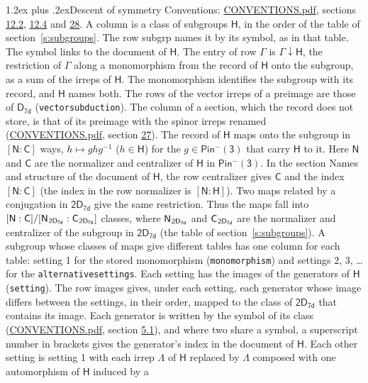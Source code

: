 \documentclass[10pt,a4paper]{article}
\makeatletter
\renewcommand\section{\@startsection{section}{1}{\z@}{-3ex plus -1ex minus -.2ex}%
  {1.2ex plus .2ex}{\normalfont\large\sffamily\bfseries\color{parttitle}}}
\numberwithin{equation}{section}
\newcommand{\grp}[1]{\mathsf{#1}}
\newcommand{\grpindex}[2]{[#1 : #2]}
\newcommand{\restr}[2]{#1\!\downarrow#2}
\newcommand{\hairsp}{\mkern1mu}
\makeatother
\begin{document}
\section{Descent of symmetry}\label{s:subduction}
Conventions: \href{../../CONVENTIONS.pdf}{CONVENTIONS.pdf}, sections \href{../../../rotation/CONVENTIONS.pdf\#conv.12.2}{12.2}, \href{../../../rotation/CONVENTIONS.pdf\#conv.12.4}{12.4} and \href{../../CONVENTIONS.pdf\#conv.28}{28}.
A column is a class of subgroups $\grp{H}$, in the order of the table of section~\ref{s:subgroups}. The row subgrp names it by its symbol, as in that table. The symbol links to the document of $\grp{H}$. The entry of row $\Gamma$ is $\restr{\Gamma}{\grp{H}}$, the restriction of $\Gamma$ along a monomorphism from the record of $\grp{H}$ onto the subgroup, as a sum of the irreps of $\grp{H}$. The monomorphism identifies the subgroup with its record, and $\grp{H}$ names both. The rows of the vector irreps of a preimage are those of \href{../../../rotation/data/pdf/D7d.pdf}{$\grp{D_{7d}}$} (\texttt{vectorsubduction}). The column of a section, which the record does not store, is that of its preimage with the spinor irreps renamed (\href{../../CONVENTIONS.pdf}{CONVENTIONS.pdf}, section \href{../../CONVENTIONS.pdf\#conv.27}{27}). \label{n:group.normalizer.o3}\label{n:group.centralizer.o3}\label{n:element.h}The record of $\grp{H}$ maps onto the subgroup in $\grpindex{\grp{N}}{\grp{C}}$ ways, $h \mapsto g h g^{-1}$ ($h \in \grp{H}$) for the $g \in \grp{Pin^{-}(3)}$ that carry $\grp{H}$ to it. Here $\grp{N}$ and $\grp{C}$ are the normalizer and centralizer of $\grp{H}$ in \href{Pinminus3.pdf}{$\grp{Pin^{-}(3)}$}. In the section Names and structure of the document of $\grp{H}$, the row centralizer gives $\grp{C}$ and the index $\grpindex{\grp{N}}{\grp{C}}$ (the index in the row normalizer is $\grpindex{\grp{N}}{\grp{H}}$). Two maps related by a conjugation in $\grp{2D_{7d}}$ give the same restriction. Thus the maps fall into $\grpindex{\grp{N}}{\grp{C}}/\grpindex{\grp{N}_{\hairsp \grp{2D_{7d}}}}{\grp{C}_{\hairsp \grp{2D_{7d}}}}$ classes, where $\grp{N}_{\hairsp \grp{2D_{7d}}}$ and $\grp{C}_{\hairsp \grp{2D_{7d}}}$ are the normalizer and centralizer of the subgroup in $\grp{2D_{7d}}$ (the table of section~\ref{s:subgroups}). \label{n:head.setting}A subgroup whose classes of maps give different tables has one column for each table: setting 1 for the stored monomorphism (\texttt{monomorphism}) and settings 2, 3, \dots{} for the \texttt{alternativesettings}. Each setting has the images of the generators of $\grp{H}$ (\texttt{setting}). \label{n:head.images}The row images gives, under each setting, each generator whose image differs between the settings, in their order, mapped to the class of $\grp{2D_{7d}}$ that contains its image. Each generator is written by the symbol of its class (\href{../../CONVENTIONS.pdf}{CONVENTIONS.pdf}, section \href{../../../rotation/CONVENTIONS.pdf\#conv.5.1}{5.1}), and where two share a symbol, a superscript number in brackets gives the generator's index in the document of $\grp{H}$. \label{n:irrep.Delta}Each other setting is setting 1 with each irrep $\Lambda$ of $\grp{H}$ replaced by $\Lambda$ composed with one automorphism of $\grp{H}$ induced by a 
\end{document}
